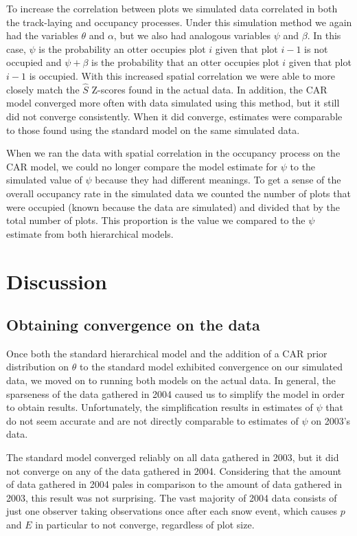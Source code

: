 \documentclass[12pt]{article}
\begin{document}
    To increase the correlation between plots we simulated data
    correlated in both the track-laying and occupancy processes. Under this 
    simulation method we
    again had the variables $\theta$ and $\alpha$, but we also had analogous
    variables $ \psi$ and $\beta$. In this case, $\psi$ is the probability an
    otter occupies plot $i$ given that plot $i-1$ is not occupied and $\psi+
    \beta$ is the probability that an otter occupies plot $i$ given that plot
    $i-1$ is occupied. With this increased spatial correlation we were able to
    more closely match the $\hat{S}$ Z-scores found in the actual data. In
    addition, the CAR model converged more often with data simulated using this
    method, but it still did not converge consistently. When it did converge,
    estimates were comparable to those found using the standard model on the
    same simulated data.

    When we ran the data with spatial correlation in the occupancy process on
    the CAR model, we could no longer compare the model estimate for $\psi$ to
    the simulated value of $\psi$ because they had different meanings. To get a
    sense of the overall occupancy rate in the simulated data we counted the
    number of plots that were occupied (known because the data are simulated)
    and divided that by the total number of plots. This proportion is the value
    we compared to the $\psi$ estimate from both hierarchical models.

\section{Discussion}

    \subsection{Obtaining convergence on the data}
    Once both the standard hierarchical model and the addition of a CAR prior
    distribution on \(\theta\) to the standard model exhibited convergence on
    our simulated data, we moved on to running both models on the actual data.
    In general, the sparseness of the data gathered in 2004 caused us to
    simplify the model in order to obtain results. Unfortunately, the
    simplification results in estimates of \(\psi\) that do not seem accurate
    and are not directly comparable to estimates of \(\psi\) on 2003's data.

    The standard model converged reliably on all data gathered in 2003, but it
    did not converge on any of the data gathered in 2004. Considering that the
    amount of data gathered in 2004 pales in comparison to the amount of data
    gathered in 2003, this result was not surprising. The vast majority of
    2004 data consists of just one observer taking observations once after
    each snow event, which causes \(p\) and \(E\) in particular to not converge,
    regardless of plot size.
\end{document}
